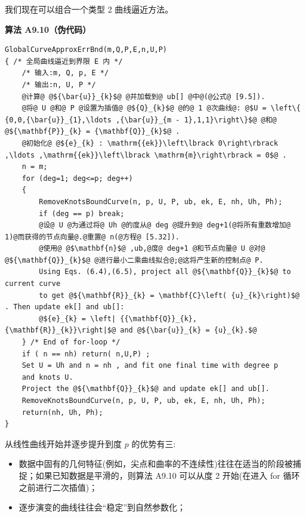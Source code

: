 \documentclass[../main.tex]{subfiles}
\begin{document}
我们现在可以组合一个类型 2 曲线逼近方法。

\par\medskip\noindent\textbf{算法 A9.10（伪代码）}\par
\begin{verbatim}
GlobalCurveApproxErrBnd(m,Q,P,E,n,U,P)
{ /* 全局曲线逼近到界限 E 内 */
    /* 输入:m, Q, p, E */
    /* 输出:n, U, P */
    @计算@ @${\bar{u}}_{k}$@ @并加载到@ ub[] @中@(@公式@ [9.5]).
    @将@ U @和@ P @设置为插值@ @${Q}_{k}$@ @的@ 1 @次曲线@: @$U = \left\{ {0,0,{\bar{u}}_{1},\ldots ,{\bar{u}}_{m - 1},1,1}\right\}$@ @和@ @${\mathbf{P}}_{k} = {\mathbf{Q}}_{k}$@ .
    @初始化@ @${e}_{k} : \mathrm{{ek}}\left\lbrack 0\right\rbrack ,\ldots ,\mathrm{{ek}}\left\lbrack \mathrm{m}\right\rbrack = 0$@ .
    n = m;
    for (deg=1; deg<=p; deg++)
    {
        RemoveKnotsBoundCurve(n, p, U, P, ub, ek, E, nh, Uh, Ph);
        if (deg == p) break;
        @设@ U @为通过将@ Uh @的度从@ deg @提升到@ deg+1(@将所有重数增加@ 1)@而获得的节点向量@.@重置@ n(@方程@ [5.32]).
        @使用@ @$\mathbf{n}$@ ,ub,@度@ deg+1 @和节点向量@ U @对@ @${\mathbf{Q}}_{k}$@ @进行最小二乘曲线拟合@;@这将产生新的控制点@ P.
        Using Eqs. (6.4),(6.5), project all @${\mathbf{Q}}_{k}$@ to current curve
        to get @${\mathbf{R}}_{k} = \mathbf{C}\left( {u}_{k}\right)$@ . Then update ek[] and ub[]:
        @${e}_{k} = \left| {{\mathbf{Q}}_{k},{\mathbf{R}}_{k}}\right|$@ and @${\bar{u}}_{k} = {u}_{k}.$@
    } /* End of for-loop */
    if ( n == nh) return( n,U,P) ;
    Set U = Uh and n = nh , and fit one final time with degree p
    and knots U.
    Project the @${\mathbf{Q}}_{k}$@ and update ek[] and ub[].
    RemoveKnotsBoundCurve(n, p, U, P, ub, ek, E, nh, Uh, Ph);
    return(nh, Uh, Ph);
}
\end{verbatim}

从线性曲线开始并逐步提升到度 \(p\) 的优势有三:

\begin{itemize}
\item 数据中固有的几何特征(例如，尖点和曲率的不连续性)往往在适当的阶段被捕捉；如果已知数据是平滑的，则算法 A9.10 可以从度 2 开始(在进入 for 循环之前进行二次插值)；
\end{itemize}

\begin{itemize}
\item 逐步演变的曲线往往会“稳定”到自然参数化；
\end{itemize}
\end{document}
